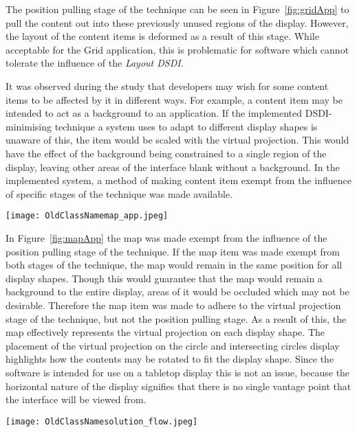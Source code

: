 \documentclass[review,5p,times,twocolumn]{elsarticle}
\begin{document}
The position pulling stage of the technique can be seen in Figure~\ref{fig:gridApp} to pull the content out into these previously unused regions of the display.
However, the layout of the content items is deformed as a result of this stage.
While acceptable for the Grid application, this is problematic for software which cannot tolerate the influence of the {\emph{Layout \ac{DSDI}}}.

It was observed during the study that developers may wish for some content items to be affected by it in different ways.
For example, a content item may be intended to act as a background to an application.
If the implemented \ac{DSDI}-minimising technique a system uses to adapt to different display shapes is unaware of this, the item would be scaled with the virtual projection.
This would have the effect of the background being constrained to a single region of the display, leaving other areas of the interface blank without a background.
In the implemented system, a method of making content item exempt from the influence of specific stages of the technique was made available.

\begin{figure*}[t!] 
	\centerline{\texttt{[image: OldClassNamemap\_app.jpeg]}}
	\caption{Influence of the implemented technique on {\emph{SynergyNet}}'s {\emph{Simple Map}} application.}
	\label{fig:mapApp}
\end{figure*}

In Figure~\ref{fig:mapApp} the map was made exempt from the influence of the position pulling stage of the technique.
If the map item was made exempt from both stages of the technique, the map would remain in the same position for all display shapes.
Though this would guarantee that the map would remain a background to the entire display, areas of it would be occluded which may not be desirable.
Therefore the map item was made to adhere to the virtual projection stage of the technique, but not the position pulling stage.
As a result of this, the map effectively represents the virtual projection on each display shape.
The placement of the virtual projection on the circle and intersecting circles display highlights how the contents may be rotated to fit the display shape.
Since the software is intended for use on a tabletop display this is not an issue, because the horizontal nature of the display signifies that there is no single vantage point that the interface will be viewed from.

\begin{figure*}[t] 
 \centering
   \texttt{[image: OldClassNamesolution\_flow.jpeg]}
   \caption{Flowchart demonstrating navigation of the technique.}
   \label{fig:flowchart}
\end{figure*}
\end{document}
